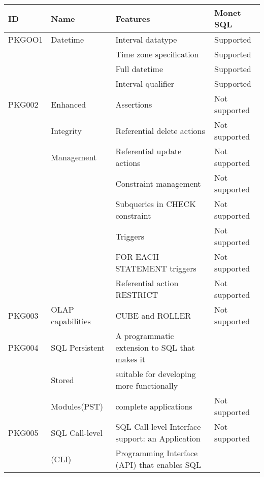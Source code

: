 \documentclass[10pt,twocolumn,fleqn]{article}
\begin{document}
\onecolumn
\begin{tabular}{l | l | l| l |}\\
ID	&Name		&Features		&Monet SQL	\\\hline
PKGOO1	&Datetime	&Interval datatype		& Supported\\
	&		&Time zone specification	& Supported\\
	&		&Full datetime			& Supported\\
	&		&Interval qualifier 		& Supported\\
PKG002	&Enhanced 	&Assertions		& Not supported\\
	&Integrity	&Referential delete actions	& Not supported\\
	&Management	&Referential update actions& Not supported\\
	&		&Constraint management		& Not supported\\
	&	 	&Subqueries in CHECK constraint	& Not supported\\
	&	 	&Triggers			& Not supported\\
	&	 	&FOR EACH STATEMENT triggers	& Not supported\\
	&	 	&Referential action RESTRICT	& Not supported\\
PKG003	&OLAP capabilities&CUBE and ROLLER		& Not supported\\
PKG004	&SQL Persistent	&A programmatic extension to SQL that makes it	& \\
	&Stored		&suitable for developing more functionally	& \\
	&Modules(PST)	&complete applications	& Not supported\\
PKG005	&SQL Call-level	&SQL Call-level Interface support: an Application	& Not supported\\
&(CLI)	&Programming Interface (API) that enables SQL	& \\

\end{tabular}
\end{document}

